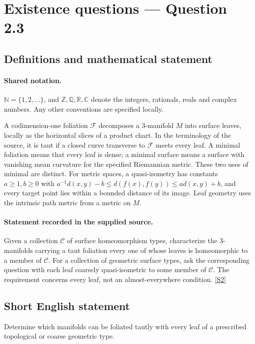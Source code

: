 \documentclass[11pt]{article}
\newcommand{\sref}[2]{\hyperlink{source:#1:#2}{[S#2]}}
\begin{document}
\section{Existence questions — Question 2.3}\label{statement}

\subsection{Definitions and mathematical statement}

\paragraph{Shared notation.}$\mathbb N=\{1,2,\ldots\}$, and $\mathbb Z,\mathbb Q,\mathbb R,\mathbb C$ denote the integers, rationals, reals and complex numbers. Any other conventions are specified locally.


A codimension-one foliation $\mathcal F$ decomposes a $3$-manifold $M$ into surface leaves, locally as the horizontal slices of a product chart. In the terminology of the source, it is taut if a closed curve transverse to $\mathcal F$ meets every leaf. A minimal foliation means that every leaf is dense; a minimal surface means a surface with vanishing mean curvature for the specified Riemannian metric. These two uses of minimal are distinct. For metric spaces, a quasi-isometry has constants $a\ge1,b\ge0$ with $a^{-1}d(x,y)-b\le d(f(x),f(y))\le a d(x,y)+b$, and every target point lies within a bounded distance of its image. Leaf geometry uses the intrinsic path metric from a metric on $M$.
\paragraph{Statement recorded in the supplied source.}
Given a collection $\mathscr C$ of surface homeomorphism types, characterize the $3$-manifolds carrying a taut foliation every one of whose leaves is homeomorphic to a member of $\mathscr C$. For a collection of geometric surface types, ask the corresponding question with each leaf coarsely quasi-isometric to some member of $\mathscr C$. The requirement concerns every leaf, not an almost-everywhere condition. \sref{statement}{2}
\subsection{Short English statement}
Determine which manifolds can be foliated tautly with every leaf of a prescribed topological or coarse geometric type.
\end{document}
